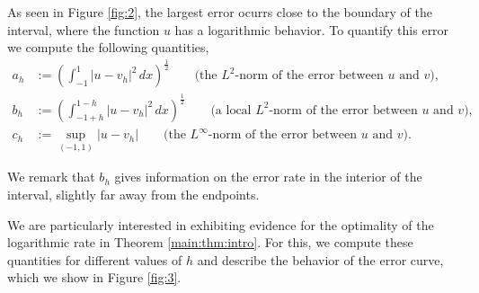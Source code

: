 \documentclass[10 pt]{article}
\numberwithin{equation}{section}
\begin{document}
As seen in Figure \ref{fig:2}, the largest error ocurrs close to the boundary of the interval, where the function $u$ has a logarithmic behavior.  To quantify this error we compute the following quantities,
\begin{align*}
 a_h&:=\left(\int_{-1}^1 |u-v_h|^2\, dx\right)^\frac{1}{2}\qquad \text{(the $L^2$-norm of the error between $u$ and $v$)},\\
 b_h&:=\left(\int_{-1+h}^{1-h} |u-v_h|^2\, dx\right)^\frac{1}{2}\qquad \text{(a local $L^2$-norm of the error between $u$ and $v$)},\\
 c_h&:=\sup_{(-1,1)} |u-v_h|\qquad \text{(the $L^\infty$-norm of the error between $u$ and $v$)}.
\end{align*}

We remark that $b_h$ gives information on the error rate in the interior of the interval, slightly far away from the endpoints. 

We are particularly interested in exhibiting evidence for the optimality of the logarithmic rate in Theorem \ref{main:thm:intro}.  For this, we compute these quantities for different values of $h$ and describe the behavior of the error curve, which we show in Figure \ref{fig:3}.
\end{document}
